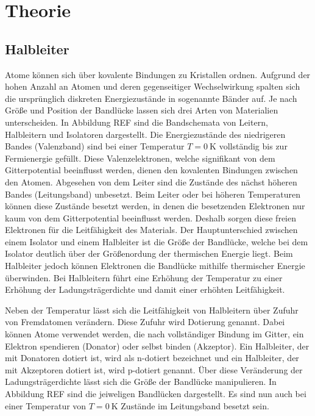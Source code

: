 \section{Theorie}
\label{sec:Theorie}


\subsection{Halbleiter}
Atome können sich über kovalente Bindungen zu Kristallen ordnen.
Aufgrund der hohen Anzahl an Atomen und deren gegenseitiger Wechselwirkung spalten sich die ursprünglich diskreten Energiezustände in sogenannte Bänder auf.
Je nach Größe und Position der Bandlücke lassen sich drei Arten von Materialien unterscheiden.
In Abbildung REF sind die Bandschemata von Leitern, Halbleitern und Isolatoren dargestellt.
Die Energiezustände des niedrigeren Bandes (Valenzband) sind bei einer Temperatur $T=\SI{0}{\kelvin}$ vollständig bis zur Fermienergie gefüllt.
Diese Valenzelektronen, welche signifikant von dem Gitterpotential beeinflusst werden, dienen den kovalenten Bindungen zwischen den Atomen. 
Abgesehen von dem Leiter sind die Zustände des nächst höheren Bandes (Leitungsband) unbesetzt. 
Beim Leiter oder bei höheren Temperaturen können diese Zustände besetzt werden, in denen die besetzenden Elektronen nur kaum von dem Gitterpotential beeinflusst werden.
Deshalb sorgen diese freien Elektronen für die Leitfähigkeit des Materials. 
Der Hauptunterschied zwischen einem Isolator und einem Halbleiter ist die Größe der Bandlücke, welche bei dem Isolator deutlich über der Größenordung der thermischen Energie liegt.
Beim Halbleiter jedoch können Elektronen die Bandlücke mithilfe thermischer Energie überwinden.
Bei Halbleitern führt eine Erhöhung der Temperatur zu einer Erhöhung der Ladungsträgerdichte und damit einer erhöhten Leitfähigkeit.



Neben der Temperatur lässt sich die Leitfähigkeit von Halbleitern über Zufuhr von Fremdatomen verändern.
Diese Zufuhr wird Dotierung genannt.
Dabei können Atome verwendet werden, die nach vollständiger Bindung im Gitter, ein Elektron spendieren (Donator) oder selbst binden (Akzeptor). 
Ein Halbleiter, der mit Donatoren dotiert ist, wird als n-dotiert bezeichnet und ein Halbleiter, der mit Akzeptoren dotiert ist, wird p-dotiert genannt.
Über diese Veränderung der Ladungsträgerdichte lässt sich die Größe der Bandlücke manipulieren. 
In Abbildung REF sind die jeiweligen Bandlücken dargestellt.
Es sind nun auch bei einer Temperatur von $T=\SI{0}{\kelvin}$ Zustände im Leitungsband besetzt sein.



